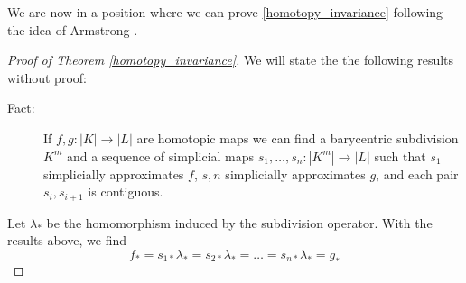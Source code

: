 \documentclass[toc=bib, headinclude]{scrartcl}
\theoremstyle{plain}
\theoremstyle{definition}
\theoremstyle{remark}
\begin{document}
	We are now in a position where we can prove \autoref{homotopy_invariance} following the idea of Armstrong \parencite[p. 189f]{ar}.
	\begin{proof}[Proof of Theorem \ref{homotopy_invariance}]
		We will state the the following results without proof:
		\begin{description}
			\item[Fact:] If $f,g:|K|\to |L|$ are homotopic maps we can find a barycentric subdivision $K^m$ and a sequence of simplicial maps $s_1,\dots,s_n:|K^m|\to|L|$ such that $s_1$ simplicially approximates $f$, $s,n$ simplicially approximates $g$, and each pair $s_i,s_{i+1}$ is contiguous.
		\end{description}
		Let $\lambda_\ast$ be the homomorphism induced by the subdivision operator. With the results above, we find
		\[
		f_\ast=s_{1\ast}\lambda_\ast=s_{2\ast}\lambda_\ast=\dots=s_{n\ast}\lambda_\ast=g_\ast
		\]
	\end{proof}
	




\printbibliography
\end{document}
